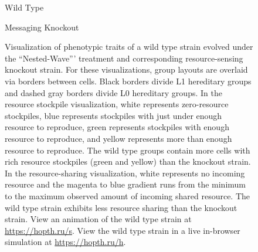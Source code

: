 \begin{figure}[!htbp]
\begin{center}
\vspace{1.0ex}

\hspace*{\fill}%
\begin{minipage}[t]{0.05\columnwidth}
\vspace{0pt} %
\end{minipage}%
\hfill
\begin{minipage}[t]{0.45\columnwidth}
\centering
\vspace{0pt} %
Wild Type
\end{minipage}%
\hfill
\begin{minipage}[t]{0.45\columnwidth}
\centering
\vspace{0pt} %
Messaging Knockout
\end{minipage}%
\hspace*{\fill}

\vspace{1.0ex}

\caption{
Visualization of phenotypic traits of a wild type strain evolved under the ``Nested-Wave''' treatment and corresponding resource-sensing knockout strain.
For these visualizations, group layouts are overlaid via borders between cells.
Black borders divide L1 hereditary groups and dashed gray borders divide L0 hereditary groups.
In the resource stockpile visualization, white represents zero-resource stockpiles, blue represents stockpiles with just under enough resource to reproduce, green represents stockpiles with enough resource to reproduce, and yellow represents more than enough resource to reproduce.
The wild type groups contain more cells with rich resource stockpiles (green and yellow) than the knockout strain.
In the resource-sharing visualization, white represents no incoming resource and the magenta to blue gradient runs from the minimum to the maximum observed amount of incoming shared resource.
The wild type strain exhibits less resource sharing than the knockout strain.
View an animation of the wild type strain at \url{https://hopth.ru/s}.
View the wild type strain in a live in-browser simulation at \url{https://hopth.ru/h}.
}
\label{fig:ko-stockpiletrigger-sharing}
\end{center}
\end{figure}
